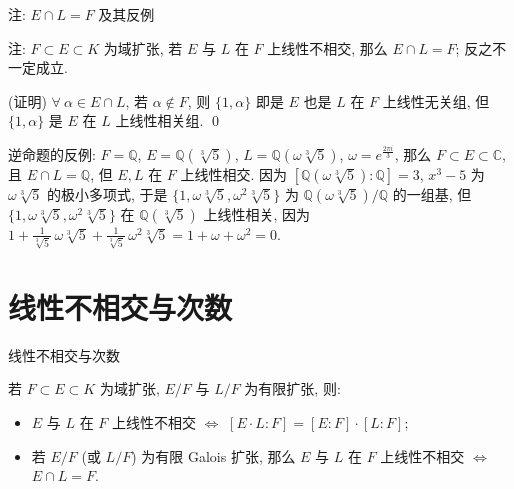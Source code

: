 
\begin{frame}{注: $E \cap L = F$ 及其反例}

注: $F \subset E \subset K$ 为域扩张, 若 $E$ 与 $L$ 在 $F$ 上线性不相交,
那么 $E \cap L = F$; 反之不一定成立.

\startproof[bg=yellow, fg=red](证明)
$\forall\ \alpha \in E \cap L$, 若 $\alpha \notin F$,
则 $\{1, \alpha\}$ 即是 $E$ 也是 $L$ 在 $F$ 上线性无关组,
但 $\{1, \alpha\}$ 是 $E$ 在 $L$ 上线性相关组.
\qed

\pause

逆命题的反例:
$F = \mathbb{Q}$, $E = \mathbb{Q}(\sqrt[3]{5})$, $L = \mathbb{Q}(\omega\sqrt[3]{5})$,
$\omega = e^{\frac{2\pi i}{3}}$,
那么 $F \subset E \subset \mathbb{C}$, 且 $E \cap L = \mathbb{Q}$,
但 $E, L$ 在 $F$ 上线性相交.
因为 $[\mathbb{Q}(\omega\sqrt[3]{5}):\mathbb{Q}] = 3$,
$x^3 - 5$ 为 $\omega\sqrt[3]{5}$ 的极小多项式,
于是 $\{1, \omega\sqrt[3]{5}, \omega^2\sqrt[3]{5}\}$ 为
$\mathbb{Q}(\omega\sqrt[3]{5})/\mathbb{Q}$ 的一组基,
但 $\{1, \omega\sqrt[3]{5}, \omega^2\sqrt[3]{5}\}$ 在 $\mathbb{Q}(\sqrt[3]{5})$
上线性相关,
因为 $1 + \frac{1}{\sqrt[3]{5}}\,\omega\sqrt[3]{5}
+ \frac{1}{\sqrt[3]{5}}\,\omega^2\sqrt[3]{5} = 1 + \omega + \omega^2 = 0$.

\end{frame}


\section[判据]{线性不相交与次数}


\begin{frame}{线性不相交与次数}

\begin{cor}[线性不相交与次数]
若 $F \subset E \subset K$ 为域扩张, $E/F$ 与 $L/F$ 为有限扩张, 则:
\begin{itemize}
\item[(i)] $E$ 与 $L$ 在 $F$ 上线性不相交 $\iff$
  $[E \cdot L:F] = [E:F] \cdot [L:F]$;
\item[(ii)] 若 $E/F$ (或 $L/F$) 为有限 Galois 扩张, 那么
  $E$ 与 $L$ 在 $F$ 上线性不相交 $\iff$ $E \cap L = F$.
\end{itemize}
\end{cor}

\end{frame}

